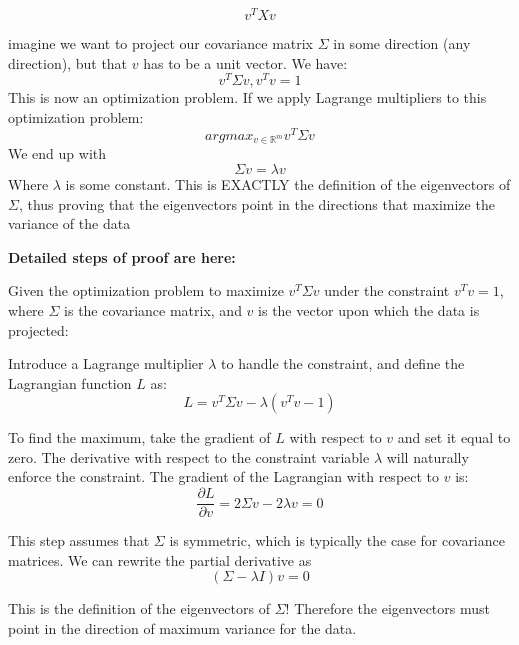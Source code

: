 \documentclass[12pt]{article}
\begin{document}
\begin{enumerate}
\[ v^T X v\]

imagine we want to project our covariance matrix \(\Sigma\) in some direction (any direction), but that \(v\) has to be a unit vector. We have:
\[ v^T \Sigma v, v^T v = 1\]
This is now an optimization problem. If we apply Lagrange multipliers to this optimization problem: \[argmax_{v \in \mathbb{R}^m} v^T \Sigma v\] We end up with \[\Sigma v = \lambda v\] Where \(\lambda\) is some constant. This is EXACTLY the definition of the eigenvectors of \(\Sigma\), thus proving that the eigenvectors point in the directions that maximize the variance of the data

\textbf{Detailed steps of proof are here:}


Given the optimization problem to maximize $v^T \Sigma v$ under the constraint $v^T v = 1$, where $\Sigma$ is the covariance matrix, and $v$ is the vector upon which the data is projected:

Introduce a Lagrange multiplier $\lambda$ to handle the constraint, and define the Lagrangian function $L$ as:
\[ L = v^T \Sigma v - \lambda (v^T v - 1) \]

To find the maximum, take the gradient of $L$ with respect to $v$ and set it equal to zero. The derivative with respect to the constraint variable $\lambda$ will naturally enforce the constraint. The gradient of the Lagrangian with respect to $v$ is:
\[ \frac{\partial L}{\partial v} = 2\Sigma v - 2\lambda v = 0 \]


This step assumes that $\Sigma$ is symmetric, which is typically the case for covariance matrices. 
We can rewrite the partial derivative as 
\[ (\Sigma - \lambda I)v = 0 \] 

This is the definition of the eigenvectors of \(\Sigma\)! Therefore the eigenvectors must point in the direction of maximum variance for the data.



\end{enumerate}
\end{document}
